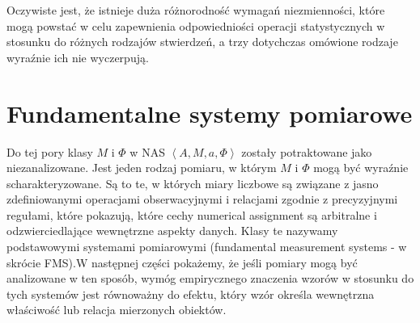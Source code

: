 \documentclass[12pt,a4paper]{report}
\newcommand{\tuple}[1]{\left\langle {#1} \right\rangle}
\begin{document}
Oczywiste jest, że istnieje duża różnorodność wymagań niezmienności, które mogą powstać w celu zapewnienia odpowiedniości operacji statystycznych w stosunku do różnych rodzajów stwierdzeń, a trzy dotychczas omówione rodzaje wyraźnie ich nie wyczerpują.
\section{Fundamentalne systemy pomiarowe}

Do tej pory klasy $M$ i $\Phi$ w NAS $\tuple{A,M,a,\Phi}$ zostały potraktowane jako niezanalizowane. Jest jeden rodzaj pomiaru, w którym $M$ i $\Phi$ mogą być wyraźnie scharakteryzowane. Są to te, w których miary liczbowe są związane z jasno zdefiniowanymi operacjami obserwacyjnymi i relacjami zgodnie z precyzyjnymi regułami, które pokazują, które cechy numerical assignment są arbitralne i odzwierciedlające wewnętrzne aspekty danych. Klasy te nazywamy podstawowymi systemami pomiarowymi (fundamental measurement systems - w skrócie FMS).W następnej części pokażemy, że jeśli pomiary mogą być analizowane w ten sposób, wymóg empirycznego znaczenia wzorów w stosunku do tych systemów jest równoważny do efektu, który wzór określa wewnętrzna właściwość lub relacja mierzonych obiektów.
\end{document}
